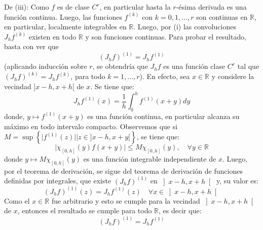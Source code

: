\documentclass[12pt]{report}
\theoremstyle{largebreak}
\newcommand\abs[1]{\ensuremath{\big|#1\big|}}
\begin{document}
\begin{sol}
        De (iii): Como $f$ es de clase $C^r$, en particular hasta la $r$-ésima derivada es una función continua. Luego, las funciones $f^{(k)}$ con $k=0,1,...,r$ son continuas en $\mathbb{R}$, en particular, localmente integrables en $\mathbb{R}$. Luego, por (i) las convoluciones $J_hf^{(k)}$ existen en todo $\mathbb{R}$ y son funciones continuas. Para probar el resultado, basta con ver que
        \begin{equation*}
            (J_hf)^{(1)}=J_hf^{(1)}
        \end{equation*}
        (aplicando inducción sobre $r$, se obtendría que $J_hf$ es una función clase $C^r$ tal que $\left(J_hf\right)^{(k)}=J_hf^{(k)}$, para todo $k=1,...,r$). En efecto, sea $x\in\mathbb{R}$ y considere la vecindad $]x-h,x+h[$ de $x$. Se tiene que:
        \begin{equation*}
            J_hf^{(1)}(x)=\frac{1}{h}\int_0^hf^{(1)}(x+y)dy
        \end{equation*}
        donde, $y\mapsto f^{(1)}(x+y)$ es una función continua, en particular alcanza su máximo en todo intervalo compacto. Observemos que si $M=\sup\left\{\abs{f^{(1)}(z)}\Big|z\in ]x-h,x+y[ \right\} $, se tiene que:
        \begin{equation*}
            \abs{\chi_{ [0,h]}(y)f(x+y)}\leq M\chi_{[0,h]}(y),\quad\forall y\in\mathbb{R}
        \end{equation*}
        donde $y\mapsto M\chi_{[0,h]}(y)$ es una función integrable independiente de $x$. Luego, por el teorema de derivación, se sigue del teorema de derivación de funciones definidas por integrales, que existe $(J_hf)^{(1)}$ en $\left]x-h,x+h\right[$ y, su valor es:
        \begin{equation*}
            (J_hf)^{(1)}(z)=J_hf^{(1)}(z)\quad\forall x\in\left]x-h,x+h\right[
        \end{equation*}
        Como el $x\in\mathbb{R}$ fue arbitrario y esto se cumple para la vecindad $\left]x-h,x+h\right[$ de $x$, entonces el resultado se cumple para todo $\mathbb{R}$, es decir que:
        \begin{equation*}
            (J_hf)^{(1)}=J_hf^{(1)}
        \end{equation*}
    \end{sol}
\end{document}
